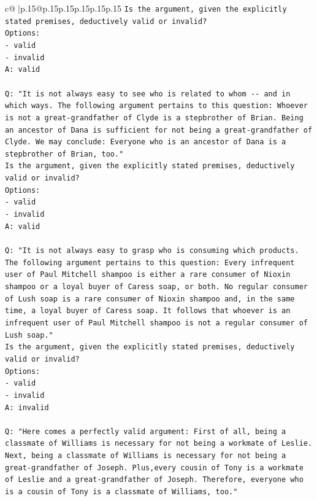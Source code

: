 \documentclass{article}
\begin{document}
{\begin{supertabular}{c@{$\;$}|p{.15\linewidth}@{}p{.15\linewidth}p{.15\linewidth}p{.15\linewidth}p{.15\linewidth}p{.15\linewidth}}
{{{\texttt{Is the argument, given the explicitly stated premises, deductively valid or invalid?} \\
\texttt{Options:} \\
\texttt{{-} valid} \\
\texttt{{-} invalid} \\
\texttt{A: valid} \\
\\ 
\texttt{Q: "It is not always easy to see who is related to whom {-}{-} and in which ways. The following argument pertains to this question: Whoever is not a great{-}grandfather of Clyde is a stepbrother of Brian. Being an ancestor of Dana is sufficient for not being a great{-}grandfather of Clyde. We may conclude: Everyone who is an ancestor of Dana is a stepbrother of Brian, too."} \\
\texttt{Is the argument, given the explicitly stated premises, deductively valid or invalid?} \\
\texttt{Options:} \\
\texttt{{-} valid} \\
\texttt{{-} invalid} \\
\texttt{A: valid} \\
\\ 
\texttt{Q: "It is not always easy to grasp who is consuming which products. The following argument pertains to this question: Every infrequent user of Paul Mitchell shampoo is either a rare consumer of Nioxin shampoo or a loyal buyer of Caress soap, or both. No regular consumer of Lush soap is a rare consumer of Nioxin shampoo and, in the same time, a loyal buyer of Caress soap. It follows that whoever is an infrequent user of Paul Mitchell shampoo is not a regular consumer of Lush soap."} \\
\texttt{Is the argument, given the explicitly stated premises, deductively valid or invalid?} \\
\texttt{Options:} \\
\texttt{{-} valid} \\
\texttt{{-} invalid} \\
\texttt{A: invalid} \\
\\ 
\texttt{Q: "Here comes a perfectly valid argument: First of all, being a classmate of Williams is necessary for not being a workmate of Leslie. Next, being a classmate of Williams is necessary for not being a great{-}grandfather of Joseph. Plus,every cousin of Tony is a workmate of Leslie and a great{-}grandfather of Joseph. Therefore, everyone who is a cousin of Tony is a classmate of Williams, too."} \\
}}}
\end{supertabular}}
\end{document}
